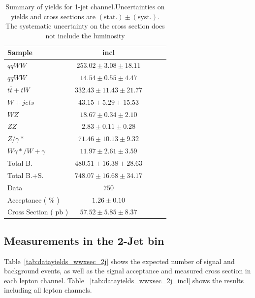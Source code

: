 \begin{table}[!ht]
{\small
\begin{center}
\begin{tabular}{|l|c|c|c|c|}
\hline
Sample  & incl  \\ \hline
$qqWW$  & $253.02 \pm 3.08 \pm 18.11 $  \\
$qqWW$  & $14.54 \pm 0.55 \pm 4.47 $    \\
$t\bar{t} + tW$ & $332.43 \pm 11.43 \pm 21.77 $ \\
$W+jets$    & $43.15 \pm 5.29 \pm 15.53 $   \\
$WZ$    & $18.67 \pm 0.34 \pm 2.10 $    \\
$ZZ$    & $2.83 \pm 0.11 \pm 0.28 $ \\
$Z/\gamma*$ & $71.46 \pm 10.13 \pm 9.32 $   \\
$W\gamma*/W+\gamma$ & $11.97 \pm 2.61 \pm 3.59 $    \\
\hline \hline
Total B.    & $480.51 \pm 16.38 \pm 28.63 $ \\ \hline \hline
Total B.+S. & $748.07 \pm 16.68 \pm 34.17 $ \\ \hline \hline
Data    & $750$     \\ \hline \hline
Acceptance ( \% )   & $1.26 \pm 0.10    $\\
Cross Section ( pb )    & $57.52 \pm 5.85 \pm 8.37$     \\ \hline
\end{tabular}
\caption{Summary of yields for 1-jet channel.Uncertainties on yields and cross sections are $\mathrm{(stat.)} \pm \mathrm{(syst.)}$. The systematic uncertainty on the cross section does not include the luminosity}
\label{tab:datayields_wwxsec_1j_incl}
\end{center}}
\end{table}

\clearpage
\subsection{Measurements in the 2-Jet bin}

Table~\ref{tab:datayields_wwxsec_2j} shows the expected number of signal and background events,
as well as the signal acceptance and measured cross section in each lepton channel.
Table ~\ref{tab:datayields_wwxsec_2j_incl} shows the results including all lepton channels.

